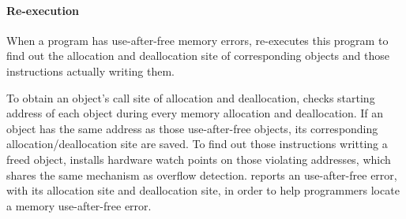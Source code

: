 \paragraph{Re-execution}
When a program has use-after-free memory errors, \doubletake{} re-executes this program to find out the allocation and deallocation site of corresponding objects and those instructions actually writing them.

To obtain an object's call site of allocation and deallocation, 
\doubletake{} checks starting address of each object during every memory allocation and deallocation. If an object has the same address as those use-after-free objects, its corresponding allocation/deallocation site are saved. To find out those instructions writting a freed object, 
\doubletake{} installs hardware watch points on those violating addresses, which shares the same mechanism as overflow detection.
\doubletake{} reports an use-after-free error, with its allocation site and deallocation site, in order to help programmers locate a memory use-after-free error. 